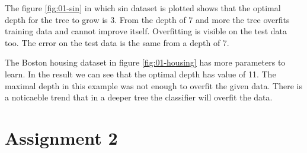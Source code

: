\documentclass[12pt]{article}
\begin{document}
The figure \ref{fig:01-sin} in which sin dataset is plotted shows that the optimal depth for the tree to grow is 3. From the depth of 7 and more the tree overfits training data and cannot improve itself. Overfitting is visible on the test data too. The error on the test data is the same from a depth of 7.

The Boston housing dataset in figure \ref{fig:01-housing} has more parameters to learn. In the result we can see that the optimal depth has value of 11. The maximal depth in this example was not enough to overfit the given data. There is a noticaeble trend that in a deeper tree the classifier will overfit the data.

\newpage

\section{Assignment 2}
\end{document}
